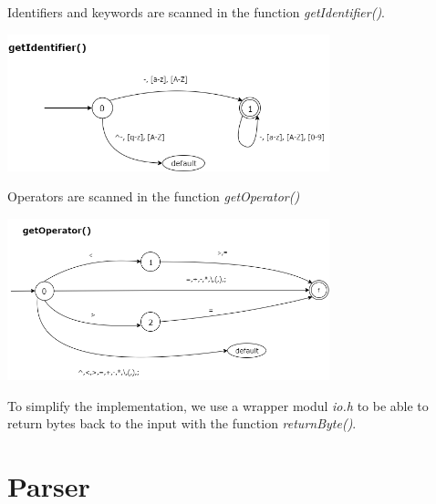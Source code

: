 \documentclass[10pt,a4paper,titlepage]{article}
\begin{document}
\begin{justify}
Identifiers and keywords are scanned in the function \textit{getIdentifier()}.
\end{justify}
\begin{center}
  \includegraphics[width=0.7\textwidth]{img/getIdentifier.png}
\end{center}

\begin{justify}
Operators are scanned in the function \textit{getOperator()}
\end{justify}
\begin{center}
  \includegraphics[width=0.7\textwidth]{img/getOperator.png}
\end{center}

\begin{justify}
To simplify the implementation, we use a wrapper modul \textit{io.h} to
be able to return bytes back to the input with the function \textit{returnByte()}.
\end{justify}

\newpage

\section{Parser}
\end{document}
